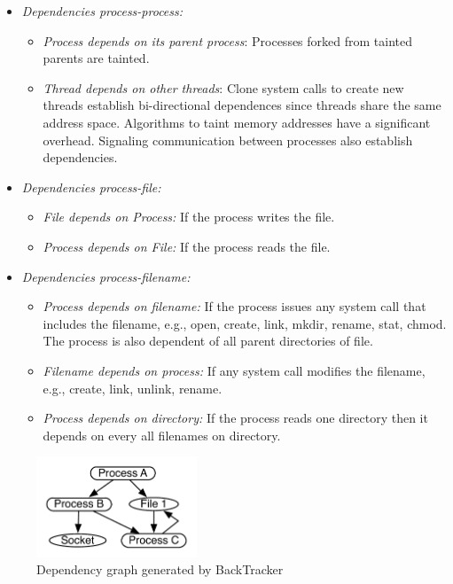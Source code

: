 \begin{itemize}
\item \textit{Dependencies process-process:}
\begin{itemize}
\item \textit{Process depends on its parent process}: Processes forked from tainted parents are tainted.
\item \textit{Thread depends on other threads}: Clone system calls to create new threads establish bi-directional dependences since threads share the same address space. Algorithms to taint memory addresses \cite{bezoar} have a significant overhead. Signaling communication between processes also establish dependencies.
\end{itemize}
\item \textit{Dependencies process-file:}
\begin{itemize}
\item \textit{File depends on Process:} If the process writes the file.
\item \textit{Process depends on File:} If the process reads the file. 
\end{itemize}

\item \textit{Dependencies process-filename:}
\begin{itemize}
\item \textit{Process depends on filename:} If the process issues any system call that includes the filename, e.g., open, create, link, mkdir, rename, stat, chmod. The process is also dependent of all parent directories of file.
\item \textit{Filename depends on process:} If any system call modifies the filename, e.g., create, link, unlink, rename.
\item \textit{Process depends on directory:} If the process reads one directory then it depends on every all filenames on directory.
\end{itemize}
\end{itemize}

\begin{figure}
\includegraphics[height=30mm]{images/depGraph}
\centering
\caption{Dependency graph generated by BackTracker}
\label{fig:backtracker_graph}
\end{figure}

